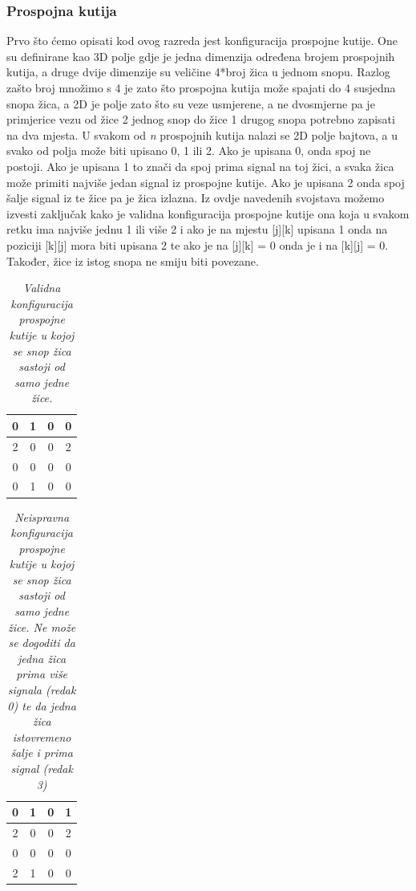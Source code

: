 \documentclass[times, utf8, zavrsni]{fer}
\begin{document}
\subsubsection{Prospojna kutija}

Prvo što ćemo opisati kod ovog razreda jest konfiguracija prospojne kutije. One su definirane kao 3D polje gdje je jedna dimenzija određena brojem prospojnih kutija, a druge dvije dimenzije su veličine 4*broj žica u jednom snopu. Razlog zašto broj množimo s 4 je zato što prospojna kutija može spajati do 4 susjedna snopa žica, a 2D je polje zato što su veze usmjerene, a ne dvosmjerne pa je primjerice vezu od žice 2 jednog snop do žice 1 drugog snopa potrebno zapisati na dva mjesta. U svakom od \emph{n} prospojnih kutija nalazi se 2D polje bajtova, a u svako od polja može biti upisano 0, 1 ili 2. Ako je upisana 0, onda spoj ne postoji. Ako je upisana 1 to znači da spoj prima signal na toj žici, a svaka žica može primiti najviše jedan signal iz prospojne kutije. Ako je upisana 2 onda spoj šalje signal iz te žice pa je žica izlazna. Iz ovdje navedenih svojstava možemo izvesti zaključak kako je validna konfiguracija prospojne kutije ona koja u svakom retku ima najviše jednu 1 ili više 2 i ako je na mjestu [j][k] upisana 1 onda na poziciji [k][j] mora biti upisana 2 te ako je na [j][k] = 0 onda je i na [k][j] = 0. Također, žice iz istog snopa ne smiju biti povezane.


 \begin{table}[htb]
	\caption{\emph{Validna konfiguracija prospojne kutije u kojoj se snop žica sastoji od samo jedne žice.}}
	\label{swConfValid}
	\centering
	\begin{tabular}{|c|c|c|c|} \hline
		0 & 1 & 0 & 0 \\ \hline
		2 & 0 & 0 & 2 \\ \hline
		0 & 0 & 0 & 0 \\ \hline
		0 & 1 & 0 & 0 \\ \hline
	\end{tabular}
\end{table}


 \begin{table}[!htb]
	\caption{\emph{Neispravna konfiguracija prospojne kutije u kojoj se snop žica sastoji od samo jedne žice. Ne može se dogoditi da jedna žica prima više signala (redak 0) te da jedna žica istovremeno šalje i prima signal (redak 3) }}
	\label{swConfInvalid}
	\centering
	\begin{tabular}{|c|c|c|c|} \hline
		0 & 1 & 0 & 1 \\ \hline
		2 & 0 & 0 & 2 \\ \hline
		0 & 0 & 0 & 0 \\ \hline
		2 & 1 & 0 & 0 \\ \hline
	\end{tabular}
\end{table}
\end{document}
